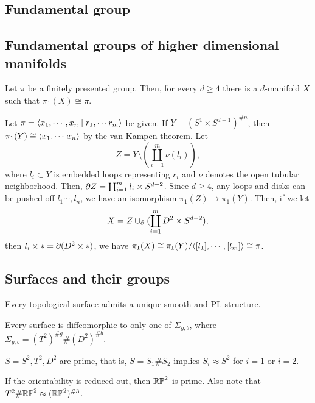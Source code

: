 \documentclass{../../small}
\begin{document}
\subsection*{Fundamental group}
\subsection{Fundamental groups of higher dimensional manifolds}
\begin{prop}
Let $\pi$ be a finitely presented group.
Then, for every $d\ge4$ there is a $d$-manifold $X$ such that $\pi_1(X)\cong\pi$.
\end{prop}
\begin{pf}
Let $\pi=\langle x_1,\cdots,x_n\mid r_1,\cdots r_m\rangle$ be given.
If $Y=(S^1\times S^{d-1})^{\#n}$, then $\pi_1(Y)\cong\langle x_1,\cdots\,x_n\rangle$ by the van Kampen theorem.
Let
\[Z=Y\setminus(\coprod_{i=1}^m\nu(l_i)),\]
where $l_i\subset Y$ is embedded loops representing $r_i$ and $\nu$ denotes the open tubular neighborhood.
Then, $\pd Z=\coprod_{i=1}^ml_i\times S^{d-2}$.
Since $d\ge4$, any loops and disks can be pushed off $l_1\cdots,l_n$, we have an isomorphism $\pi_1(Z)\to\pi_1(Y)$.
Then, if we let
\[X=Z\cup_{\pd}(\coprod_{i=1}^mD^2\times S^{d-2}),\] then $l_i\times*=\pd(D^2\times*)$, we have $\pi_1(X)\cong\pi_1(Y)/\langle[l_1],\cdots,[l_m]\rangle\cong\pi$.
\end{pf}

\subsection{Surfaces and their groups}

\begin{thm}
Every topological surface admits a unique smooth and PL structure.
\end{thm}

\begin{thm}
Every surface is diffeomorphic to only one of $\Sigma_{g,b}$, where $\Sigma_{g,b}=(T^2)^{\#g}\#(D^2)^{\#b}$.
\end{thm}

\begin{cor}
$S=S^2,T^2,D^2$ are prime, that is, $S=S_1\#S_2$ implies $S_i\approx S^2$ for $i=1$ or $i=2$.
\end{cor}

\begin{rmk}
If the orientability is reduced out, then $\mathbb{RP}^2$ is prime.
Also note that $T^2\#\mathbb{RP}^2\approx(\mathbb{RP}^2)^{\#3}$.
\end{rmk}
\end{document}
